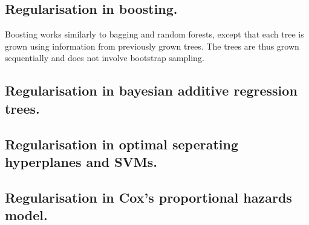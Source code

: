 \documentclass[12pt]{article}
\begin{document}
\subsection*{Regularisation in boosting.}
Boosting works similarly to bagging and random forests, except that each tree is grown using information from previously grown trees. The trees are thus grown sequentially and does not involve bootstrap sampling.


\subsection*{Regularisation in bayesian additive regression trees.}



\subsection*{Regularisation in optimal seperating hyperplanes and SVMs.}

\subsection*{Regularisation in Cox's proportional hazards model.}
\end{document}
